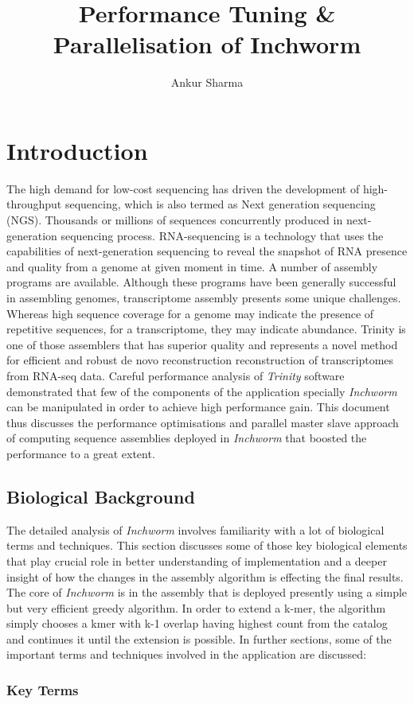 \documentclass[plainarticle,zihtitle,english,final,hyperref,utf8]{zihpub}
\author{Ankur Sharma}
\title{Performance Tuning \& Parallelisation of Inchworm}
\begin{document}
\section{Introduction} The high demand for low-cost sequencing has driven the development of high-throughput sequencing, which is also termed as Next generation sequencing (NGS). Thousands or millions of sequences concurrently produced in next-generation sequencing process. RNA-sequencing is a technology that uses the capabilities of next-generation sequencing to reveal the snapshot of RNA presence and quality from a genome at given moment in time. A number of assembly programs are available. Although these programs have been generally successful in assembling genomes, transcriptome assembly presents some unique challenges. Whereas high sequence coverage for a genome may indicate the presence of repetitive sequences, for a transcriptome, they may indicate abundance. Trinity is one of those assemblers that has superior quality and represents a novel method for efficient and robust de novo reconstruction reconstruction of transcriptomes from RNA-seq data. Careful performance analysis of \emph{Trinity} software demonstrated that few of the components of the application specially \emph{Inchworm} can be manipulated in order to achieve high performance gain. This document thus discusses the performance optimisations and parallel master slave approach of computing sequence assemblies deployed in \emph{Inchworm} that boosted the performance to a great extent.
\subsection{Biological Background}
The detailed analysis of \emph{Inchworm} involves familiarity with a lot of biological terms and techniques. This section discusses some of those key biological elements that play crucial role in better understanding of implementation and a deeper insight of how the changes in the assembly algorithm is effecting the final results. The core of \emph{Inchworm} is in the assembly that is deployed presently using a simple but very efficient greedy algorithm. In order to extend a k-mer, the algorithm simply chooses a kmer with k-1 overlap having highest count from the catalog and continues it until the extension is possible. In further sections, some of the important terms and techniques involved in the application are discussed:
\subsubsection{Key Terms}
\end{document}
